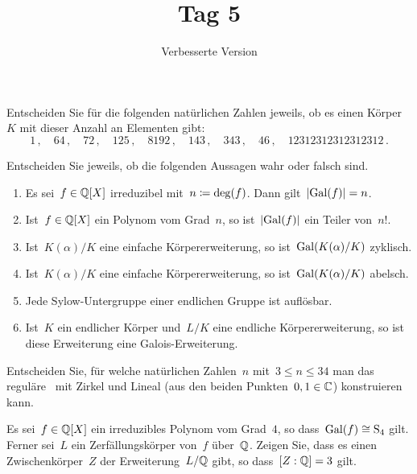 \documentclass{scrartcl}
\title{\vspace{-1em}Tag 5}
\subtitle{Verbesserte Version}
\author{}
\date{}
\begin{document}
\maketitle
\vspace{-7em}

\begin{exercise}[subtitle = {Erstklausur~18/19, Zweitklausur~18/19}]
  Entscheiden Sie für die folgenden natürlichen Zahlen jeweils, ob es einen Körper~$K$ mit dieser Anzahl an Elementen gibt:
  \[
    1 \,,
    \quad
    64 \,,
    \quad
    72 \,,
    \quad
    125 \,,
    \quad
    8192 \,,
    \quad
    143 \,,
    \quad
    343 \,,
    \quad
    46 \,,
    \quad
    12312312312312312 \,.
  \]
\end{exercise}

\begin{exercise}[subtitle = {Erstklausur~18/19, Zweitklausur~19/20}]
  Entscheiden Sie jeweils, ob die folgenden Aussagen wahr oder falsch sind.
  \begin{enumerate}
    \item
      Es sei~$f \in \mathbb{Q}[X]$ irreduzibel mit~$n \coloneqq \deg(f)$.
      Dann gilt~$\lvert \operatorname{Gal}(f) \rvert = n$.
    \item
      Ist~$f \in \mathbb{Q}[X]$ ein Polynom vom Grad~$n$, so ist~$\lvert \operatorname{Gal}(f) \rvert$ ein Teiler von~$n!$.
    \item
      Ist~$K(\alpha)/K$ eine einfache Körpererweiterung, so ist~$\operatorname{Gal}( K(\alpha) / K )$ zyklisch.
    \item
      Ist~$K(\alpha)/K$ eine einfache Körpererweiterung, so ist~$\operatorname{Gal}( K(\alpha) / K )$ abelsch.
    \item
      Jede Sylow-Untergruppe einer endlichen Gruppe ist auflösbar.
    \item
      Ist~$K$ ein endlicher Körper und~$L/K$ eine endliche Körpererweiterung, so ist diese Erweiterung eine Galois-Erweiterung.
  \end{enumerate}
\end{exercise}

\begin{exercise}[subtitle = {Erstklausur~18/19}]
  Entscheiden Sie, für welche natürlichen Zahlen~$n$ mit~$3 \leq n \leq 34$ man das reguläre~ mit Zirkel und Lineal (aus den beiden Punkten~$0,1 \in \mathbb{C}$) konstruieren kann.
\end{exercise}

\begin{exercise}[subtitle = {Erstklausur~18/19}]
  Es sei~$f \in \mathbb{Q}[X]$ ein irreduzibles Polynom vom Grad~$4$, so dass~$\operatorname{Gal}(f) \cong \operatorname{S}_4$ gilt.
  Ferner sei~$L$ ein Zerfällungskörper von~$f$ über~$\mathbb{Q}$.
  Zeigen Sie, dass es einen Zwischenkörper~$Z$ der Erweiterung~$L / \mathbb{Q}$ gibt, so dass~$[Z : \mathbb{Q}] = 3$ gilt.
\end{exercise}
\end{document}
